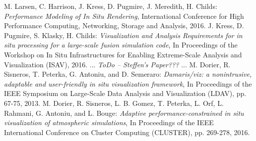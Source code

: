 \begin{thebibliography}{0}
%
M. Larsen, C. Harrison, J. Kress, D. Pugmire, J. Meredith, H. Childs: 
\textsl{Performance Modeling of In Situ Rendering}, International Conference for High Performance Computing, Networking, Storage and Analysis, 2016.
%
J. Kress, D. Pugmire, S. Klasky, H. Childs:
\textsl{Visualization and Analysis Requirements for in situ processing for a large-scale fusion simulation code},
In Proceedings of the Workshop on In Situ Infrastructures for Enabling Extreme-Scale Analysis and Visualization (ISAV), 2016.
%
...
\textsl{ToDo -- Steffen's Paper???}
...
%
% 
M. Dorier, R. Sisneros, T. Peterka, G. Antoniu, and D. Semeraro: 
\textsl{Damaris/viz: a nonintrusive, adaptable and user-friendly in situ visualization framework},
In Proceedings of the IEEE Symposium on Large-Scale Data Analysis and Visualization (LDAV), pp. 67-75, 2013.
%
M. Dorier, R. Sisneros, L. B. Gomez, T. Peterka, L. Orf, L. Rahmani, G. Antoniu, and L. Bouge:
\textsl{Adaptive performance-constrained in situ visualization of atmospheric simulations},
In Proceedings of the IEEE International Conference on Cluster Computing (CLUSTER), pp. 269-278, 2016.    
\end{thebibliography}


